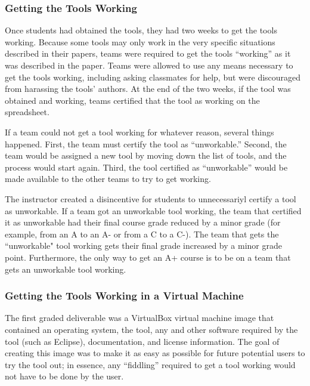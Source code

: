\documentclass{sig-alternate-05-2015}
\begin{document}

\subsubsection{Getting the Tools Working}

Once students had obtained the tools, they had two weeks to get 
the tools working.
Because some tools may only work in the very specific situations 
described in their papers,
teams were required to get the tools ``working'' as it was described
in the paper.
Teams were allowed to use any means necessary to get the tools working,
including asking classmates for help, but were discouraged from
harassing the tools' authors.
At the end of the two weeks, if the tool was obtained and working,
teams certified that the tool as working on the spreadsheet.

If a team could not get a tool working for whatever reason, 
several things happened.
First, the team must certify the tool as ``unworkable.''
Second, the team would be assigned a new tool by moving down the list
of tools, and the process would start again.
Third, the tool certified as ``unworkable'' would be made available 
to the other teams to try to get working.

The instructor created a disincentive for students to unnecessariyl 
certify a tool as unworkable.
If a team got an unworkable tool working, the team that certified it as  
unworkable had their final course grade reduced by a minor 
grade (for example, from an A to an A- or from a C to a C-).
The team that gets the ``unworkable" tool working gets their final grade increased
by a minor grade point.
Furthermore, the only way to get an A+ course is to be on a team
that gets an unworkable tool working.

\subsubsection{Getting the Tools Working in a Virtual Machine}

The first graded deliverable was a VirtualBox virtual machine
image that contained an operating system, the tool, any
and other software required by the tool (such as Eclipse),
documentation, and license information.
The goal of creating this image was to make it as
easy as possible for future potential users to try
the tool out; in essence, any ``fiddling'' required to get
a tool working would not have to be done by the user.
\end{document}
